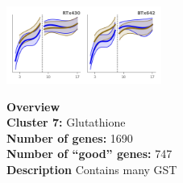 \begin{multicols}{2}
\includegraphics[width=2in]{figures/clusters/leaf_Preflowering_6.png}
\columnbreak

\noindent \textbf{Overview}\\\textbf{Cluster 7:} Glutathione \\
\textbf{Number of genes:} 1690 \\
\textbf{Number of ``good'' genes:} 747 \\
\textbf{Description} Contains many GST \\
\end{multicols}

